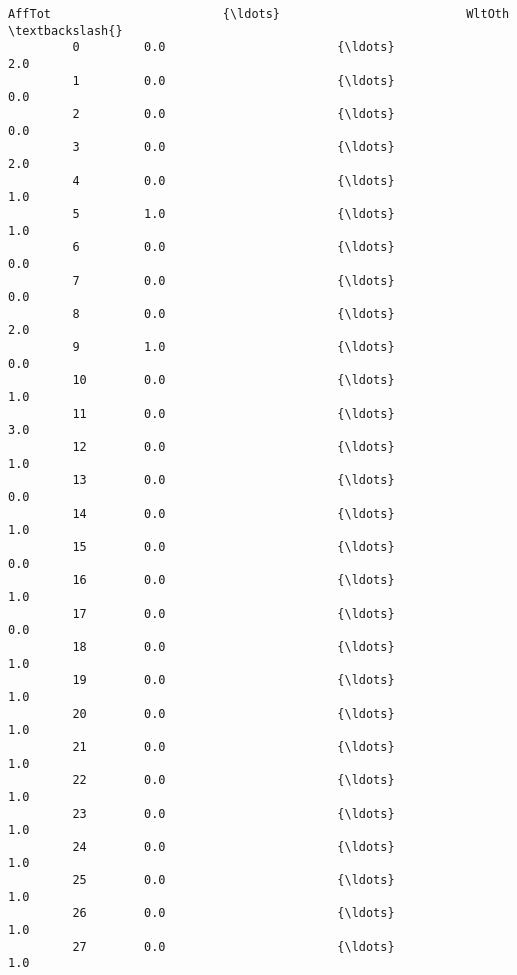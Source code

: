 \documentclass[11pt]{article}
\begin{document}
\begin{Verbatim}[commandchars=\\\{\}]
                AffTot                        {\ldots}                          WltOth  \textbackslash{}
         0         0.0                        {\ldots}                             2.0   
         1         0.0                        {\ldots}                             0.0   
         2         0.0                        {\ldots}                             0.0   
         3         0.0                        {\ldots}                             2.0   
         4         0.0                        {\ldots}                             1.0   
         5         1.0                        {\ldots}                             1.0   
         6         0.0                        {\ldots}                             0.0   
         7         0.0                        {\ldots}                             0.0   
         8         0.0                        {\ldots}                             2.0   
         9         1.0                        {\ldots}                             0.0   
         10        0.0                        {\ldots}                             1.0   
         11        0.0                        {\ldots}                             3.0   
         12        0.0                        {\ldots}                             1.0   
         13        0.0                        {\ldots}                             0.0   
         14        0.0                        {\ldots}                             1.0   
         15        0.0                        {\ldots}                             0.0   
         16        0.0                        {\ldots}                             1.0   
         17        0.0                        {\ldots}                             0.0   
         18        0.0                        {\ldots}                             1.0   
         19        0.0                        {\ldots}                             1.0   
         20        0.0                        {\ldots}                             1.0   
         21        0.0                        {\ldots}                             1.0   
         22        0.0                        {\ldots}                             1.0   
         23        0.0                        {\ldots}                             1.0   
         24        0.0                        {\ldots}                             1.0   
         25        0.0                        {\ldots}                             1.0   
         26        0.0                        {\ldots}                             1.0   
         27        0.0                        {\ldots}                             1.0   

\end{Verbatim}
\end{document}
